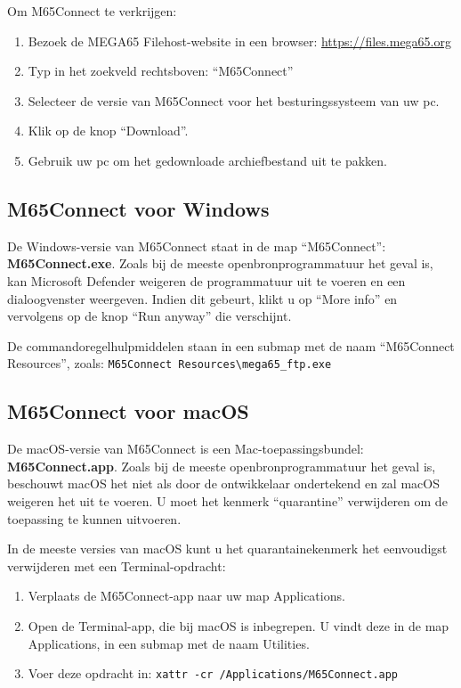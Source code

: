 Om M65Connect te verkrijgen:

\begin{enumerate}
\item Bezoek de MEGA65 Filehost-website in een browser: \url{https://files.mega65.org}\item Typ in het zoekveld rechtsboven: ``M65Connect''\item Selecteer de versie van M65Connect voor het besturingssysteem van uw pc.\item Klik op de knop ``Download''.\item Gebruik uw pc om het gedownloade archiefbestand uit te pakken.
\end{enumerate}

\subsection{M65Connect voor Windows}

De Windows-versie van M65Connect staat in de map ``M65Connect'': {\bf M65Connect.exe}. Zoals bij de meeste openbronprogrammatuur het geval is, kan Microsoft Defender weigeren de programmatuur uit te voeren en een dialoogvenster weergeven. Indien dit gebeurt, klikt u op ``More info'' en vervolgens op de knop ``Run anyway'' die verschijnt.

De commandoregelhulpmiddelen staan in een submap met de naam ``M65Connect Resources'', zoals: {\tt M65Connect Resources\textbackslash{}mega65\_ftp.exe}

\subsection{M65Connect voor macOS}

De macOS-versie van M65Connect is een Mac-toepassingsbundel: {\bf M65Connect.app}. Zoals bij de meeste openbronprogrammatuur het geval is, beschouwt macOS het niet als door de ontwikkelaar ondertekend en zal macOS weigeren het uit te voeren. U moet het kenmerk ``quarantine'' verwijderen om de toepassing te kunnen uitvoeren.

In de meeste versies van macOS kunt u het quarantainekenmerk het eenvoudigst verwijderen met een Terminal-opdracht:

\begin{enumerate}
\item Verplaats de M65Connect-app naar uw map Applications.\item Open de Terminal-app, die bij macOS is inbegrepen. U vindt deze in de map Applications, in een submap met de naam Utilities.\item Voer deze opdracht in: {\tt xattr -cr /Applications/M65Connect.app}
\end{enumerate}

